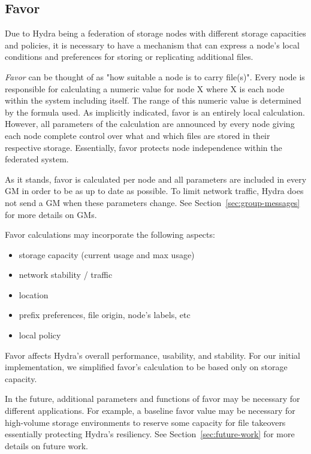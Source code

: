 \subsection{Favor} \label{sec:favor}
Due to Hydra being a federation of storage nodes with different storage capacities and policies, it is necessary to have a mechanism that can express a node's local conditions and preferences for storing or replicating additional files.

\textit{Favor} can be thought of as "how suitable a node is to carry file(s)".
Every node is responsible for calculating a numeric value for node X where X is each node within the system including itself. The range of this numeric value is determined by the formula used. As implicitly indicated, favor is an entirely local calculation. However, all parameters of the calculation are announced by every node giving each node complete control over what and which files are stored in their respective storage. Essentially, favor protects node independence within the federated system.

As it stands, favor is calculated per node and all parameters are included in every GM in order to be as up to date as possible. To limit network traffic, Hydra does not send a GM when these parameters change. See Section~\ref{sec:group-messages} for more details on GMs.

Favor calculations may incorporate the following aspects:
\begin{itemize}
    \item storage capacity (current usage and max usage)
    \item network stability / traffic
    \item location
    \item prefix preferences, file origin, node's labels, etc
    \item local policy
\end{itemize}

Favor affects Hydra's overall performance, usability, and stability. For our initial implementation, we simplified favor's calculation to be based only on storage capacity.

In the future, additional parameters and functions of favor may be necessary for different applications. For example, a baseline favor value may be necessary for high-volume storage environments to reserve some capacity for file takeovers essentially protecting Hydra's resiliency. See Section~\ref{sec:future-work} for more details on future work.